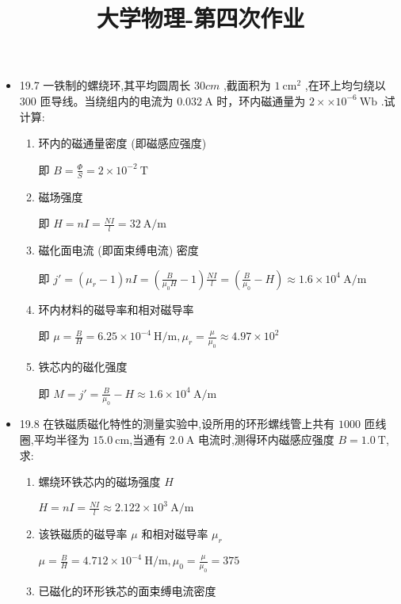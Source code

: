 
\usepackage{../../homeworks_preamble}
\title{大学物理-第四次作业}


    \maketitle
    \begin{itemize}
        \item 19.7 一铁制的螺绕环,其平均圆周长 $30cm$ ,截面积为 $1 \ \mathrm{cm^2}$ ,在环上均匀绕以 $300$ 匝导线。当绕组内的电流为 $0.032 \ \mathrm{A}$ 时，环内磁通量为 $2\times \times 10^{-6} \ \mathrm{Wb}$ .试计算:
            \begin{enumerate}
                \item 环内的磁通量密度 (即磁感应强度)

                    即 $B=\frac{\Phi}{S}=2\times 10^{-2} \ \mathrm{T}$
                \item 磁场强度

                    即 $H=nI=\frac{NI}{l}=32 \ \mathrm{A / m}$
                \item 磁化面电流 (即面束缚电流) 密度

                    即 $j'=(\mu_{r}-1)nI=(\frac{B}{\mu_0H}-1)\frac{NI}{l}=(\frac{B}{\mu_0}-H)\approx 1.6\times 10^{4} \ \mathrm{A /m}$
                \item 环内材料的磁导率和相对磁导率

                    即 $\mu=\frac{B}{H}=6.25\times 10^{-4} \ \mathrm{H / m},\mu_{r}=\frac{\mu}{\mu_0}\approx 4.97\times 10^{2}$
                \item 铁芯内的磁化强度

                    即 $M=j'=\frac{B}{\mu_0}-H\approx 1.6\times 10^{4} \ \mathrm{A / m}$
            \end{enumerate}
        \item 19.8 在铁磁质磁化特性的测量实验中,设所用的环形螺线管上共有 $1000$ 匝线圈,平均半径为 $15.0 \ \mathrm{cm}$,当通有 $2.0 \ \mathrm{A}$ 电流时,测得环内磁感应强度 $B=1.0 \ \mathrm{T}$,求:
            \begin{enumerate}
                \item 螺绕环铁芯内的磁场强度 $H$

                    $H=nI=\frac{NI}{l}\approx 2.122\times 10^{3} \ \mathrm{A /m}$
                \item 该铁磁质的磁导率 $\mu$ 和相对磁导率 $\mu_{r}$

                    $\mu=\frac{B}{H}=4.712\times 10^{-4} \ \mathrm{H / m},\mu_0=\frac{\mu}{\mu_0}=375$
                \item 已磁化的环形铁芯的面束缚电流密度


\end{enumerate}
\end{itemize}
